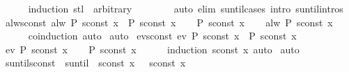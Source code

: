 \begin{isabellebody}
\ \ \ \ \isamarkupfalse%
\ {\isacharparenleft}induction\ {\isachardoublequoteopen}stl\ {\isasymomega}{\isachardoublequoteclose}\ arbitrary{\isacharcolon}\ {\isasymomega}{\isacharparenright}\isanewline
\ \ \ \ \ \ \ {\isacharparenleft}auto\ elim{\isacharcolon}\ suntil{\isachardot}cases\ intro{\isacharcolon}\ suntil{\isachardot}intros{\isacharparenright}\isanewline
{}\isamarkupfalse%
%
\endisatagproof
{\isafoldproof}%
%
\isadelimproof
\isanewline
%
\endisadelimproof
\isanewline
{}\isamarkupfalse%
\ alw{\isacharunderscore}sconst{\isacharcolon}\ {\isachardoublequoteopen}alw\ P\ {\isacharparenleft}sconst\ x{\isacharparenright}\ {\isasymlongleftrightarrow}\ P\ {\isacharparenleft}sconst\ x{\isacharparenright}{\isachardoublequoteclose}\isanewline
%
\isadelimproof
%
\endisadelimproof
%
\isatagproof
{}\isamarkupfalse%
\isanewline
\ \ \isamarkupfalse%
\ {\isachardoublequoteopen}P\ {\isacharparenleft}sconst\ x{\isacharparenright}{\isachardoublequoteclose}\ \isamarkupfalse%
\ \isamarkupfalse%
\ {\isachardoublequoteopen}alw\ P\ {\isacharparenleft}sconst\ x{\isacharparenright}{\isachardoublequoteclose}\isanewline
\ \ \ \ \isamarkupfalse%
\ coinduction\ auto\isanewline
{}\isamarkupfalse%
\ auto%
\endisatagproof
{\isafoldproof}%
%
\isadelimproof
\isanewline
%
\endisadelimproof
\isanewline
{}\isamarkupfalse%
\ ev{\isacharunderscore}sconst{\isacharcolon}\ {\isachardoublequoteopen}ev\ P\ {\isacharparenleft}sconst\ x{\isacharparenright}\ {\isasymlongleftrightarrow}\ P\ {\isacharparenleft}sconst\ x{\isacharparenright}{\isachardoublequoteclose}\isanewline
%
\isadelimproof
%
\endisadelimproof
%
\isatagproof
{}\isamarkupfalse%
\isanewline
\ \ \isamarkupfalse%
\ {\isachardoublequoteopen}ev\ P\ {\isacharparenleft}sconst\ x{\isacharparenright}{\isachardoublequoteclose}\ \isamarkupfalse%
\ \isamarkupfalse%
\ {\isachardoublequoteopen}P\ {\isacharparenleft}sconst\ x{\isacharparenright}{\isachardoublequoteclose}\isanewline
\ \ \ \ \isamarkupfalse%
\ {\isacharparenleft}induction\ {\isachardoublequoteopen}sconst\ x{\isachardoublequoteclose}{\isacharparenright}\ auto\isanewline
{}\isamarkupfalse%
\ auto%
\endisatagproof
{\isafoldproof}%
%
\isadelimproof
\isanewline
%
\endisadelimproof
\isanewline
{}\isamarkupfalse%
\ suntil{\isacharunderscore}sconst{\isacharcolon}\ {\isachardoublequoteopen}{\isacharparenleft}{\isasymphi}\ suntil\ {\isasympsi}{\isacharparenright}\ {\isacharparenleft}sconst\ x{\isacharparenright}\ {\isasymlongleftrightarrow}\ {\isasympsi}\ {\isacharparenleft}sconst\ x{\isacharparenright}{\isachardoublequoteclose}\isanewline

\end{isabellebody}
